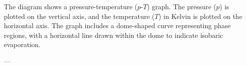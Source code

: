 The diagram shows a pressure-temperature (\(p\)-\(T\)) graph. The pressure (\(p\)) is plotted on the vertical axis, and the temperature (\(T\)) in Kelvin is plotted on the horizontal axis. The graph includes a dome-shaped curve representing phase regions, with a horizontal line drawn within the dome to indicate isobaric evaporation.

---